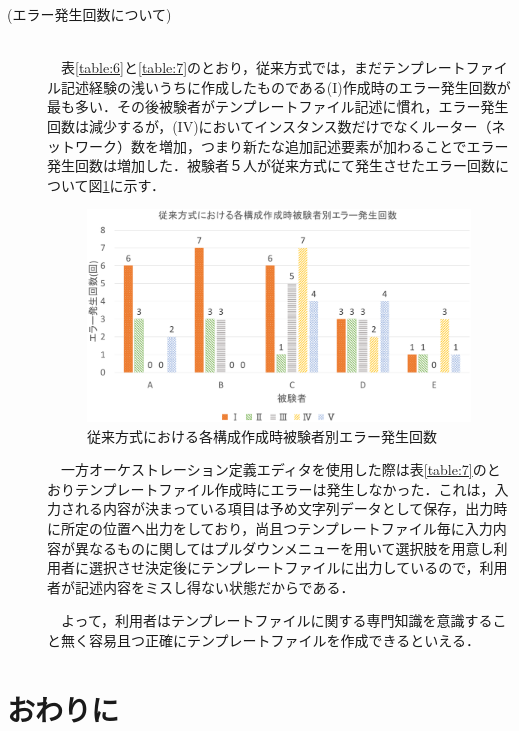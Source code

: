 \documentclass[mingoth]{kut-paper}		%
\begin{document}
\begin{description}
		\item[(エラー発生回数について)]\mbox{}\\
		　表\ref{table:6}と\ref{table:7}のとおり，従来方式では，まだテンプレートファイル記述経験の浅いうちに作成したものである(I)作成時のエラー発生回数が最も多い．その後被験者がテンプレートファイル記述に慣れ，エラー発生回数は減少するが，(I\hspace{-1pt}V)においてインスタンス数だけでなくルーター（ネットワーク）数を増加，つまり新たな追加記述要素が加わることでエラー発生回数は増加した．被験者５人が従来方式にて発生させたエラー回数について図\ref{graf:6}に示す．
		\vspace{-2.8mm}
		\begin{figure}[H]
			\begin{center}
				\includegraphics[scale=0.45]{Document/TemplateFile_ErrorGraf.eps}
				\caption{従来方式における各構成作成時被験者別エラー発生回数}
				\label{graf:6}
			\end{center}
		\end{figure}
		　一方オーケストレーション定義エディタを使用した際は表\ref{table:7}のとおりテンプレートファイル作成時にエラーは発生しなかった．これは，入力される内容が決まっている項目は予め文字列データとして保存，出力時に所定の位置へ出力をしており，尚且つテンプレートファイル毎に入力内容が異なるものに関してはプルダウンメニューを用いて選択肢を用意し利用者に選択させ決定後にテンプレートファイルに出力しているので，利用者が記述内容をミスし得ない状態だからである．
		
		　よって，利用者はテンプレートファイルに関する専門知識を意識すること無く容易且つ正確にテンプレートファイルを作成できるといえる．
	\end{description}
\chapter{おわりに}
\end{document}
